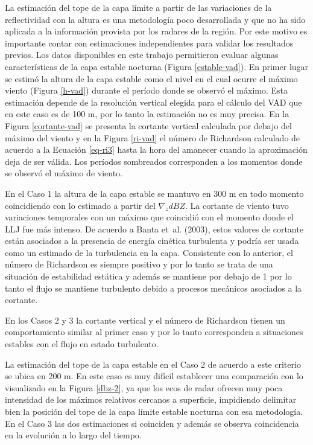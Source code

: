 \documentclass[12pt,spanish,oneside, a4paper]{book}
\begin{document}
La estimación del tope de la capa límite a partir de las variaciones de
la reflectividad con la altura es una metodología poco desarrollada y
que no ha sido aplicada a la información provista por los radares de la
región. Por este motivo es importante contar con estimaciones
independientes para validar los resultados previos. Los datos
disponibles en este trabajo permitieron evaluar algunas características
de la capa estable nocturna (Figura \ref{estable-vad}). En primer lugar
se estimó la altura de la capa estable como el nivel en el cual ocurre
el máximo viento (Figura \ref{h-vad}) durante el período donde se
observó el máximo. Esta estimación depende de la resolución vertical
elegida para el cálculo del VAD que en este caso es de 100 m, por lo
tanto la estimación no es muy precisa. En la Figura \ref{cortante-vad}
se presenta la cortante vertical calculada por debajo del máximo del
viento y en la Figura \ref{ri-vad} el número de Richardson calculado de
acuerdo a la Ecuación \ref{eq-ri3} hasta la hora del amanecer cuando la
aproximación deja de ser válida. Los períodos sombreados corresponden a
los momentos donde se observó el máximo de viento.

En el Caso 1 la altura de la capa estable se mantuvo en 300 m en todo
momento coincidiendo con lo estimado a partir del \(\nabla_z dBZ\). La
cortante de viento tuvo variaciones temporales con un máximo que
coincidió con el momento donde el LLJ fue más intenso. De acuerdo a
Banta et~al. (2003), estos valores de cortante están asociados a la
presencia de energía cinética turbulenta y podría ser usada como un
estimado de la turbulencia en la capa. Consistente con lo anterior, el
número de Richardson es siempre positivo y por lo tanto se trata de una
situación de estabilidad estática y además se mantiene por debajo de 1
por lo tanto el flujo se mantiene turbulento debido a procesos mecánicos
asociados a la cortante.

En los Casos 2 y 3 la cortante vertical y el número de Richardson tienen
un comportamiento similar al primer caso y por lo tanto corresponden a
situaciones estables con el flujo en estado turbulento.

La estimación del tope de la capa estable en el Caso 2 de acuerdo a este
criterio se ubica en 200 m. En este caso es muy difícil establecer una
comparación con lo visualizado en la Figura \ref{dbz-2}, ya que los ecos
de radar ofrecen muy poca intensidad de los máximos relativos cercanos a
superficie, impidiendo delimitar bien la posición del tope de la capa
límite estable nocturna con esa metodología. En el Caso 3 las dos
estimaciones si coinciden y además se observa coincidencia en la
evolución a lo largo del tiempo.
\end{document}
